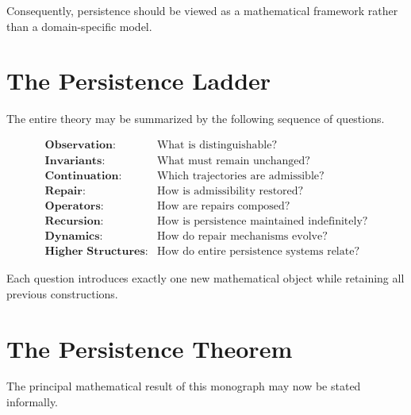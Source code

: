\documentclass[11pt]{book}
\numberwithin{equation}{chapter}
\theoremstyle{definition}
\theoremstyle{plain}
\begin{document}
Consequently, persistence should be viewed as a mathematical framework
rather than a domain-specific model.

\section{The Persistence Ladder}

The entire theory may be summarized by the following sequence of
questions.

\[
\begin{array}{ll}
\textbf{Observation:}
&
\text{What is distinguishable?}
\\[1ex]
\textbf{Invariants:}
&
\text{What must remain unchanged?}
\\[1ex]
\textbf{Continuation:}
&
\text{Which trajectories are admissible?}
\\[1ex]
\textbf{Repair:}
&
\text{How is admissibility restored?}
\\[1ex]
\textbf{Operators:}
&
\text{How are repairs composed?}
\\[1ex]
\textbf{Recursion:}
&
\text{How is persistence maintained indefinitely?}
\\[1ex]
\textbf{Dynamics:}
&
\text{How do repair mechanisms evolve?}
\\[1ex]
\textbf{Higher Structures:}
&
\text{How do entire persistence systems relate?}
\end{array}
\]

Each question introduces exactly one new mathematical object while
retaining all previous constructions.

\section{The Persistence Theorem}

The principal mathematical result of this monograph may now be stated
informally.
\end{document}
